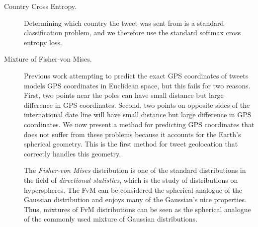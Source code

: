 \documentclass[sigconf,10pt]{acmart}
\newcommand{\defn}[1]{\textit{#1}}
\begin{document}
\begin{description}

    \item[Country Cross Entropy.]
        Determining which country the tweet was sent from is a standard classification problem,
        and we therefore use the standard softmax cross entropy loss.

    \item[Mixture of Fisher-von Mises.]


        Previous work attempting to predict the exact GPS coordinates of tweets \citep{duong2016near} models GPS coordinates in Euclidean space,
        but this fails for two reasons.
        First, two points near the poles can have small distance but large difference in GPS coordinates.
        Second, two points on opposite sides of the international date line will have small distance but large difference in GPS coordinates.
        We now present a method for predicting GPS coordinates that does not suffer from these problems because it accounts for the Earth's spherical geometry.
        This is the first method for tweet geolocation that correctly handles this geometry.

        The \defn{Fisher-von Mises} distribution is one of the standard distributions in the field of \defn{directional statistics},
        which is the study of distributions on hyperspheres.
        The FvM can be considered the spherical analogue of the Gaussian distribution \citep[e.g.][]{mardia2009directional} and enjoys many of the Gaussian's nice properties.
        Thus, mixtures of FvM distributions can be seen as the spherical analogue of the commonly used mixture of Gaussian distributions.


\end{description}
\end{document}
